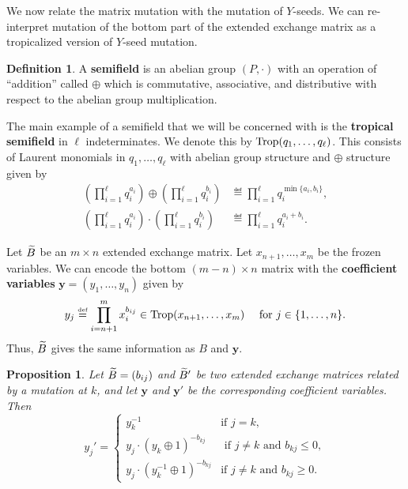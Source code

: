 \documentclass[]{pcmi}
\theoremstyle{plain}
\newtheorem{Proposition}[equation]{Proposition}
\theoremstyle{definition}
\newtheorem{Definition}[equation]{Definition}
\begin{document}
We now relate the matrix mutation with the mutation of $Y$-seeds. We can re-interpret mutation of the bottom part of the extended exchange matrix as a tropicalized version of $Y$-seed mutation. 

\begin{Definition}
    A \textbf{semifield} is an abelian group $(P, \cdot)$ with an operation of ``addition'' called $\oplus$ which is commutative, associative, and distributive with respect to the abelian group multiplication. 
\end{Definition}

The main example of a semifield that we will be concerned with is the \textbf{tropical semifield} in $\ell$ indeterminates. We denote this by $\operatorname{Trop}(q_1, \ldots, q_\ell)$. This consists of Laurent monomials in $q_1, \ldots, q_{\ell}$ with abelian group structure and $\oplus$ structure given by 
\begin{align*}
    \left( \prod_{i = 1}^\ell q_i^{a_i} \right) \oplus \left ( \prod_{i = 1}^\ell q_i^{b_i} \right ) & \eqdef  \prod_{i = 1}^\ell q_i^{\min\{a_i, b_i\}}, \\
    \left( \prod_{i = 1}^\ell q_i^{a_i} \right) \cdot \left ( \prod_{i = 1}^\ell q_i^{b_i} \right ) & \eqdef  \prod_{i = 1}^\ell q_i^{a_i + b_i}. 
\end{align*}

Let $\widetilde{B}$ be an $m \times n$ extended exchange matrix. Let $x_{n+1}, \ldots, x_m$ be the frozen variables. We can encode the bottom $(m-n) \times n$ matrix with the \textbf{coefficient variables} $\mathbf{y} = (y_1, \ldots, y_n)$ given by 
\[
    y_j \overset{\textup{\tiny def}}= \prod_{i = n+1}^m x_i^{b_{ij}} \in \operatorname{Trop}(x_{n+1}, \ldots, x_m) \quad \text{ for } j \in \{1, \ldots, n\}. 
\]
Thus, $\widetilde{B}$ gives the same information as $B$ and $\mathbf{y}$. 

\begin{Proposition}
    Let $\widetilde{B} = (b_{ij})$ and $\widetilde{B}'$ be two extended exchange matrices related by a mutation at $k$, and let $\mathbf{y}$ and $\mathbf{y}'$ be the corresponding coefficient variables. Then 
    \begin{equation}
        y_j' = 
        \begin{cases}
            y_k^{-1} & \text {if $j = k$}, \\
            y_j \cdot (y_k \oplus 1)^{-b_{kj}} & \text{ if $j \neq k$ and $b_{kj} \leq 0$}, \\
            y_j \cdot (y_k^{-1} \oplus 1)^{-b_{kj}} & \text {if $j \neq k$ and $b_{kj} \geq 0$}. 
        \end{cases}
    \end{equation}
\end{Proposition}
\end{document}
